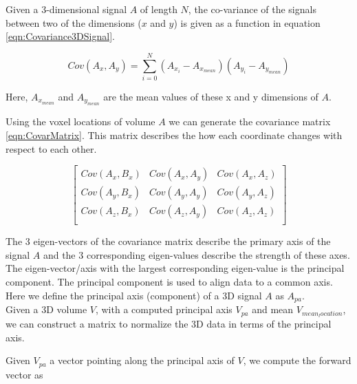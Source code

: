 Given a 3-dimensional signal $A$ of length $N$, the co-variance of the signals between two of the dimensions ($x$ and $y$) is given as a function in equation \ref{eqn:Covariance3DSignal}.

\begin{equation} \label{eqn:Covariance3DSignal}
Cov(A_x,A_y) = \sum_{i=0}^{N}(A_{x_i} - A_{x_{mean}})(A_{y_i} - A_{y_{mean}})
\end{equation}

Here, $A_{x_{mean}}$ and $A_{y_{mean}}$ are the mean values of these x and y dimensions of $A$. 

Using the voxel locations of volume $A$ we can generate the covariance matrix \ref{eqn:CovarMatrix}. This matrix describes the how each coordinate changes with respect to each other.

\begin{equation} \label{eqn:CovarMatrix}
\left[
\begin{array}{ccc}
Cov(A_x, B_x) & Cov(A_x, A_y) & Cov(A_x, A_z) \\
Cov(A_y, B_x) & Cov(A_y, A_y) & Cov(A_y, A_z) \\
Cov(A_z, B_x) & Cov(A_z, A_y) & Cov(A_z, A_z) \\
\end{array}
\right]
\end{equation}

The 3 eigen-vectors of the covariance matrix describe the primary axis of the signal $A$ and the 3 corresponding eigen-values describe the strength of these axes. The eigen-vector/axis with the largest corresponding eigen-value is the principal component. The principal component is used to align data to a common axis. Here we define the principal axis (component) of a 3D signal $A$ as $A_{pa}$. \\

Given a 3D volume $V$, with a computed principal axis $V_{pa}$ and mean $V_{mean_location}$, we can construct a matrix to normalize the 3D data in terms of the principal axis. 

Given $V_{pa}$ a vector pointing along the principal axis of $V$, we compute the forward vector as 


